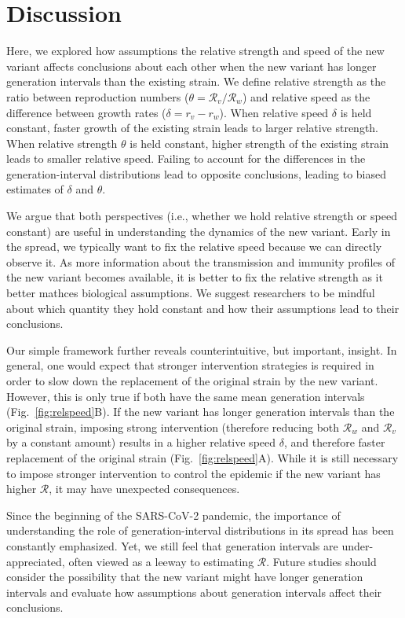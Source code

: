 \documentclass[12pt]{article}
\newcommand{\fref}[1]{Fig.~\ref{fig:#1}}
\newcommand{\RR}{\ensuremath{{\mathcal R}}\xspace}
\begin{document}
\section{Discussion}

Here, we explored how assumptions the relative strength and speed of the new variant affects conclusions about each other when the new variant has longer generation intervals than the existing strain.
We define relative strength as the ratio between reproduction numbers ($\theta=\RR_v/\RR_w$) and relative speed as the difference between growth rates ($\delta=r_v-r_w$).
When relative speed $\delta$ is held constant, faster growth of the existing strain leads to larger relative strength.
When relative strength $\theta$ is held constant, higher strength of the existing strain leads to smaller relative speed.
Failing to account for the differences in the generation-interval distributions lead to opposite conclusions, leading to biased estimates of $\delta$ and $\theta$.

We argue that both perspectives (i.e., whether we hold relative strength or speed constant) are useful in understanding the dynamics of the new variant.
Early in the spread, we typically want to fix the relative speed because we can directly observe it.
As more information about the transmission and immunity profiles of the new variant becomes available, it is better to fix the relative strength as it better mathces biological assumptions.
We suggest researchers to be mindful about which quantity they hold constant and how their assumptions lead to their conclusions.

Our simple framework further reveals counterintuitive, but important, insight.
In general, one would expect that stronger intervention strategies is required in order to slow down the replacement of the original strain by the new variant.
However, this is only true if both have the same mean generation intervals (\fref{relspeed}B).
If the new variant has longer generation intervals than the original strain, imposing strong intervention (therefore reducing both $\RR_w$ and $\RR_v$ by a constant amount) results in a higher relative speed $\delta$, and therefore faster replacement of the original strain (\fref{relspeed}A).
While it is still necessary to impose stronger intervention to control the epidemic if the new variant has higher $\RR$, it may have unexpected consequences.

Since the beginning of the SARS-CoV-2 pandemic, the importance of understanding the role of generation-interval distributions in its spread has been constantly emphasized.
Yet, we still feel that generation intervals are under-appreciated, often viewed as a leeway to estimating $\RR$.
Future studies should consider the possibility that the new variant might have longer generation intervals and evaluate how assumptions about generation intervals affect their conclusions.


\end{document}
